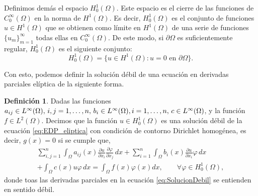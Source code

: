 \documentclass[a4paper,11pt,spanish, twoside, leqno]{tfg-uam}
\theoremstyle{definition}
\newtheorem{defin}[teor]{Definici\'on}
\begin{document}
Definimos demás el espacio $H_0^1(\Omega)$. Este espacio es el cierre de las funciones de $C_0^\infty(\Omega)$ en la norma de $H^1(\Omega)$. Es decir, $H_0^1(\Omega)$ es el conjunto de funciones $u\in H^1(\Omega)$ que se obtienen como límite en $H^1(\Omega)$ de una serie de funciones $\{u_m\}_{m=1}^\infty$ todas ellas en $C_0^\infty(\Omega)$. De este modo, si $\partial\Omega$ es suficientemente regular, $H_0^1(\Omega)$ es el siguiente conjunto:
\begin{equation}
    H_0^1(\Omega)=\{u\in H^1(\Omega): u=0 \text{ en } \partial\Omega\}.
\end{equation}

Con esto, podemos definir la solución débil de una ecuación en derivadas parciales elíptica de la siguiente forma.
\begin{mdframed}
\begin{defin}\label{def:SolucionDebil}
    Dadas las funciones $a_{ij} \in L^\infty(\Omega), \, i,j = 1,\dots, n, \, b_i \in L^\infty(\Omega), \\i= 1, \dots, n, \, c\in L^\infty(\Omega)$, y la función $f\in L^2(\Omega)$. Decimos que la función $u\in H^1_0(\Omega)$ es una solución débil de la ecuación \eqref{eq:EDP_eliptica} con condición de contorno Dirichlet homogénea, es decir, $g(x)=0$ si se cumple que, 
    \begin{equation}\label{eq:SolucionDebil}
        \begin{aligned}
            \sum_{i,j=1}^{n} \int_\Omega a_{ij}(x) \frac{\partial u}{\partial x_i} \frac{\partial \varphi}{\partial x_j}\,dx + \sum_{i=1}^{n} \int_\Omega b_i(x)\frac{\partial u}{\partial x_i} \varphi \,dx  \\+ \int_\Omega c(x)u \varphi \,dx = \int_\Omega f(x)\varphi(x) dx, \qquad \forall \varphi \in H^1_0(\Omega),
        \end{aligned}
    \end{equation}
    donde toas las derivadas parciales en la ecuación \eqref{eq:SolucionDebil} se entienden en sentido débil.
\end{defin}
\end{mdframed}
\end{document}
